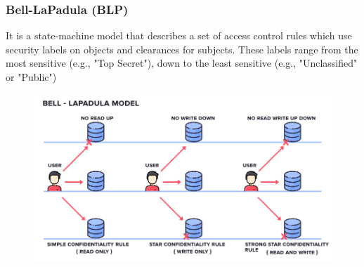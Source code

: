 \documentclass[10pt,a4paper]{report}
\begin{document}
\subsubsection{Bell-LaPadula (BLP)}
It is a state-machine model that describes a set of access control rules which use security labels on objects and clearances for subjects. These labels range from the most sensitive (e.g., "Top Secret"), down to the least sensitive (e.g., "Unclassified" or "Public")
\begin{figure}[H]
\centering
\includegraphics[scale=0.4]{32.png}
\end{figure}
\end{document}
